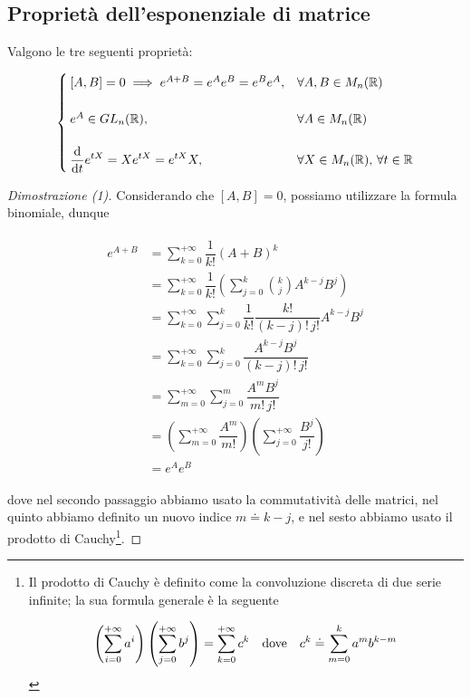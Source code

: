 \subsection{Proprietà dell'esponenziale di matrice}

Valgono le tre seguenti proprietà:

\begin{equation}
	\begin{cases}
		[A,B] = 0 \implies e^{A + B} = e^{A} e^{B} = e^{B} e^{A}, & \forall A,B \in M_{n}(\R) \\\\
		e^{A} \in GL_{n}(\R), & \forall A \in M_{n}(\R) \\\\
		\ddv{t}  e^{t X} = X e^{t X} = e^{t X} X, & \forall X\in M_{n}(\R), \, \forall t \in \R
	\end{cases}
\end{equation}

\begin{proof}[Dimostrazione (1)]
	Considerando che $ [A,B] = 0 $, possiamo utilizzare la formula binomiale, dunque
	
	\begin{align}
		\begin{split}
			e^{A + B} &= \sum_{k=0}^{+\infty} \dfrac{1}{k!} (A+B)^{k} \\
			&= \sum_{k=0}^{+\infty} \dfrac{1}{k!} \left( \sum_{j=0}^{k} \binom{k}{j} A^{k-j} B^{j} \right) \\
			&= \sum_{k=0}^{+\infty} \sum_{j=0}^{k} \dfrac{1}{k!} \dfrac{k!}{(k-j)! \, j!} A^{k-j} B^{j} \\
			&= \sum_{k=0}^{+\infty} \sum_{j=0}^{k} \dfrac{A^{k-j} B^{j}}{(k-j)! \, j!} \\
			&= \sum_{m=0}^{+\infty} \sum_{j=0}^{m} \dfrac{A^{m} B^{j}}{m! \, j!} \\
			&= \left( \sum_{m=0}^{+\infty} \dfrac{A^{m}}{m!} \right) \left( \sum_{j=0}^{+\infty} \dfrac{B^{j}}{j!} \right) \\
			&= e^{A} e^{B}
		\end{split}
	\end{align}

	dove nel secondo passaggio abbiamo usato la commutatività delle matrici, nel quinto abbiamo definito un nuovo indice $ m \doteq k-j $, e nel sesto abbiamo usato il prodotto di Cauchy\footnote{%
		Il prodotto di Cauchy è definito come la convoluzione discreta di due serie infinite; la sua formula generale è la seguente
		
		\begin{equation*}
			\left( \sum_{i=0}^{+\infty} a^{i} \right) \left( \sum_{j=0}^{+\infty} b^{j} \right) = \sum_{k=0}^{+\infty} c^{k} %
			\qq{dove} %
			c^{k} \doteq \sum_{m=0}^{k} a^{m} b^{k-m}
		\end{equation*}%
	}.
\end{proof}

